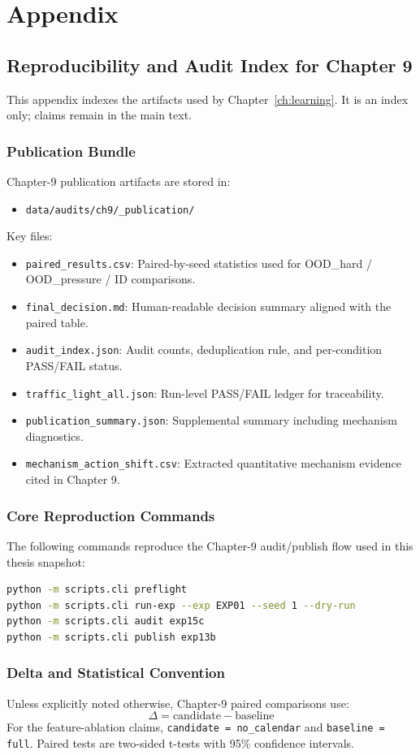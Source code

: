 \chapter{Appendix}
\label{app:repro}

\section{Reproducibility and Audit Index for Chapter 9}
\label{app:ch9-audit}

This appendix indexes the artifacts used by Chapter~\ref{ch:learning}. It is an index only; claims remain in the main text.

\subsection*{Publication Bundle}
Chapter-9 publication artifacts are stored in:
\begin{itemize}
    \item \texttt{data/audits/ch9/\_publication/}
\end{itemize}

Key files:
\begin{itemize}
    \item \texttt{paired\_results.csv}: Paired-by-seed statistics used for OOD\_hard / OOD\_pressure / ID comparisons.
    \item \texttt{final\_decision.md}: Human-readable decision summary aligned with the paired table.
    \item \texttt{audit\_index.json}: Audit counts, deduplication rule, and per-condition PASS/FAIL status.
    \item \texttt{traffic\_light\_all.json}: Run-level PASS/FAIL ledger for traceability.
    \item \texttt{publication\_summary.json}: Supplemental summary including mechanism diagnostics.
    \item \texttt{mechanism\_action\_shift.csv}: Extracted quantitative mechanism evidence cited in Chapter 9.
\end{itemize}

\subsection*{Core Reproduction Commands}
The following commands reproduce the Chapter-9 audit/publish flow used in this thesis snapshot:

\begin{lstlisting}[language=bash,basicstyle=\small\ttfamily]
python -m scripts.cli preflight
python -m scripts.cli run-exp --exp EXP01 --seed 1 --dry-run
python -m scripts.cli audit exp15c
python -m scripts.cli publish exp13b
\end{lstlisting}

\subsection*{Delta and Statistical Convention}
Unless explicitly noted otherwise, Chapter-9 paired comparisons use:
\[
\Delta = \text{candidate} - \text{baseline}
\]
For the feature-ablation claims, \texttt{candidate = no\_calendar} and \texttt{baseline = full}. Paired tests are two-sided t-tests with 95\% confidence intervals.

